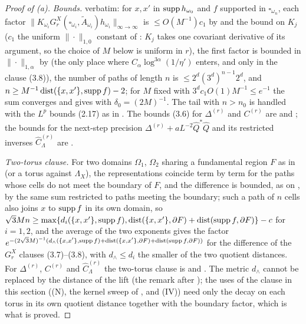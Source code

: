 \begin{proof}[Proof of (a)]
\emph{Bounds.} \cite[(2.18)--(2.22)]{Ba4} verbatim: for $x,x'$ in $\operatorname{supp} h_{\omega_0}$ and $f$ supported in $\square_{\omega_n}$, each factor $\|K_{\omega_i}G^X_r(\square_{\omega_i},\tilde A_{\omega_i})h_{\omega_i}\|_{\infty\to\infty}$ is $\le O(M^{-1})c_1$ by  and the bound on $K_j$ ($c_1$ the uniform $\|\cdot\|_{1,0}$ constant of : $K_j$ takes one covariant derivative of its argument, so the choice of $M$ below is uniform in $r$), the first factor is bounded in $\|\cdot\|_{1,\alpha}$ by  (the only place where $C_\alpha\log^{3\alpha}(1/\eta')$ enters, and only in the clause (3.8)), the number of paths of length $n$ is $\le2^d(3^d)^{n-1}2^d$, and $n\ge M^{-1}\operatorname{dist}(\{x,x'\},\operatorname{supp} f)-2$; for $M$ fixed with $3^dc_1O(1)M^{-1}\le e^{-1}$ the sum converges and gives \cite[(3.7)--(3.8)]{K1} with $\delta_0=(2M)^{-1}$. The tail with $n>n_0$ is handled with the $L^p$ bounds (2.17) as in \cite[(2.21)]{Ba4}. The bounds (3.6) for $\Delta^{(r)}$ and $C^{(r)}$ are  and ; the bounds for the next-step precision $\Delta^{(r)}+aL^{-2}\hat Q^*\hat Q$ and its restricted inverses $\hat C^{(r)}_\Lambda$ are .

\emph{Two-torus clause.} For two domains $\Omega_1$, $\Omega_2$ sharing a fundamental region $F$ as in  (or a torus against $\Lambda_X$), the representations coincide term by term for the paths whose cells do not meet the boundary of $F$, and the difference is bounded, as on \cite[p.~579]{Ba4}, by the same sum restricted to paths meeting the boundary; such a path of $n$ cells also joins $x$ to $\operatorname{supp} f$ in its own domain, so $\sqrt3Mn\ge\max\{d_i(\{x,x'\},\operatorname{supp} f),\operatorname{dist}(\{x,x'\},\partial F)+\operatorname{dist}(\operatorname{supp} f,\partial F)\}-c$ for $i=1,2$, and the average of the two exponents gives the factor $e^{-(2\sqrt3M)^{-1}(d_\wedge(\{x,x'\},\operatorname{supp} f)+\operatorname{dist}(\{x,x'\},\partial F)+\operatorname{dist}(\operatorname{supp} f,\partial F))}$ for the difference of the $G^X_r$ clauses (3.7)--(3.8), with $d_\wedge\le d_i$ the smaller of the two quotient distances. For $\Delta^{(r)}$, $C^{(r)}$ and $\hat C^{(r)}_\Lambda$ the two-torus clause is  and . The metric $d_\wedge$ cannot be replaced by the distance of the lift (the remark after ); the uses of the clause in this section ((N), the kernel sweep of , and (IV)) need only the decay on each torus in its own quotient distance together with the boundary factor, which is what is proved.


\end{proof}
